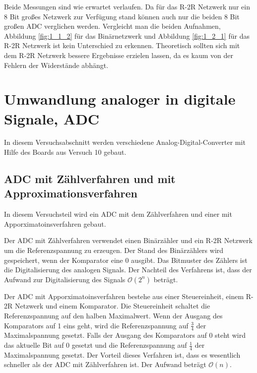 \documentclass[12pt,a4paper]{article}
\begin{document}
Beide Messungen sind wie erwartet verlaufen. Da für das R-2R Netzwerk nur ein 8 Bit großes Netzwerk zur Verfügung stand können auch nur die beiden 8 Bit großen ADC verglichen werden. Vergleicht man die beiden Aufnahmen, Abbildung \ref{fig:1_1_2} für das Binärnetzwerk und Abbildung \ref{fig:1_2_1} für das R-2R Netzwerk ist kein Unterschied zu erkennen. Theoretisch sollten sich mit dem R-2R Netzwerk bessere Ergebnisse erzielen lassen, da es kaum von der Fehlern der Widerstände abhängt.



\section{Umwandlung analoger in digitale Signale, ADC}

In diesem Versuchsabschnitt werden verschiedene Analog-Digital-Converter mit Hilfe des Boards aus Versuch 10 gebaut.

\subsection{ADC mit Zählverfahren und mit Approximationsverfahren}

In diesem Versuchsteil wird ein ADC mit dem Zählverfahren und einer mit Apporximatoinsverfahren gebaut.

Der ADC mit Zählverfahren verwendet einen Binärzähler und ein R-2R Netzwerk um die Referenzspannung zu erzeugen. Der Stand des Binärzählers wird gespeichert, wenn der Komparator eine 0 ausgibt. Das Bitmuster des Zählers ist die Digitalisierung des analogen Signals. Der Nachteil des Verfahrens ist, dass der Aufwand zur Digitalisierung des Signals $\mathcal O(2^n)$ beträgt.

Der ADC mit Apporximatoinsverfahren bestehe aus einer Steuereinheit, einem R-2R Netzwerk und einem Komparator. Die Steuereinheit schaltet die Referenzspannung auf den halben Maximalwert. Wenn der Ausgang des Komparators auf 1 eins geht, wird die Referenzspannung auf $\frac{3}{4}$ der Maximalspannung gesetzt. Falls der Ausgang des Komparators auf 0 steht wird das aktuelle Bit auf 0 gesetzt und die Referenzspannung auf $\frac{1}{4}$ der Maximalspannung gesetzt. Der Vorteil dieses Verfahren ist, dass es wesentlich schneller als der ADC mit Zählverfahren ist. Der Aufwand beträgt $\mathcal O(n)$.
\end{document}
